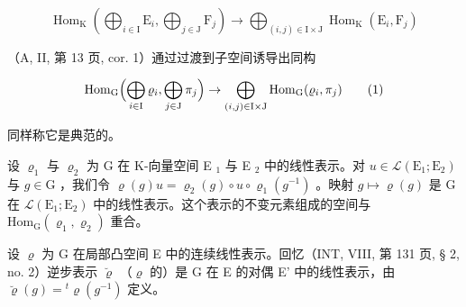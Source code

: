 \[
\operatorname{Hom} _ {\mathrm{K}} \left(\bigoplus_ {i \in \mathrm{I}} \mathrm{E} _ {i}, \bigoplus_ {j \in \mathrm{J}} \mathrm{F} _ {j}\right)\rightarrow \bigoplus_ {(i, j) \in \mathrm{I} \times \mathrm{J}} \operatorname{Hom} _ {\mathrm{K}} (\mathrm{E} _ {i}, \mathrm{F} _ {j})
\]

（A, II, 第 13 页, cor. 1）通过过渡到子空间诱导出同构

\[
\mathrm{Hom} _ {\mathrm{G}} \Bigl (\bigoplus_ {i \in \mathrm{I}} \varrho_ {i}, \bigoplus_ {j \in \mathrm{J}} \pi_ {j} \Bigr) \to \bigoplus_ {(i, j) \in \mathrm{I} \times \mathrm{J}} \mathrm{Hom} _ {\mathrm{G}} (\varrho_ {i}, \pi_ {j})\tag{1}
\]

同样称它是典范的。

设 \(\varrho_{1}\) 与 \(\varrho_{2}\) 为 G 在 K-向量空间 E \(_{1}\) 与 E \(_{2}\) 中的线性表示。对 \(u \in \mathcal{L}(\mathrm{E}_{1};\mathrm{E}_{2})\) 与 \(g \in \mathrm{G}\) ，我们令 \(\varrho(g)u = \varrho_{2}(g) \circ u \circ \varrho_{1}(g^{-1})\) 。映射 \(g \mapsto \varrho(g)\) 是 G 在 \(\mathcal{L}(\mathrm{E}_{1};\mathrm{E}_{2})\) 中的线性表示。这个表示的不变元素组成的空间与 \(\mathrm{Hom}_{\mathrm{G}}(\varrho_{1},\varrho_{2})\) 重合。

设 \(\varrho\) 为 G 在局部凸空间 E 中的连续线性表示。回忆（INT, VIII, 第 131 页, § 2, no. 2）逆步表示 \(\breve{\varrho}\) （\(\varrho\) 的）是 G 在 E 的对偶 E' 中的线性表示，由 \(\breve{\varrho}(g) = {}^{t} \varrho(g^{-1})\) 定义。


